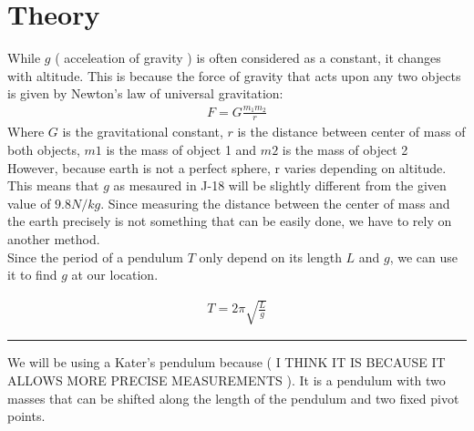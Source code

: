 \documentclass{report}
\begin{document}
\section*{Theory}

While $g$ ( acceleation of gravity ) is often considered as a constant, it changes with altitude. This is because the force of gravity that acts upon any two objects is given by Newton’s law of universal gravitation:
\begin{gather}
    F=G\frac{m_1m_2}{r}
\end{gather}
Where $G$ is the gravitational constant, $r$ is the distance between center of mass of both objects, $m1$ is the mass of object 1 and $m2$ is the mass of object 2\\

However, because earth is not a perfect sphere, r varies depending on altitude. This means that $g$ as mesaured in J-18 will be slightly different from the given value of $9.8 N/kg$. Since measuring the distance between the center of mass and the earth precisely is not something that can be easily done, we have to rely on another method.\\ 

Since the period of a pendulum $T$ only depend on its length $L$  and $g$, we can use it to find $g$ at our location.

\begin{gather}
    T=2\pi\sqrt{\frac{L}{g}}
\end{gather}

\noindent\textcolor{red}{\rule{10cm}{1mm}}

We will be using a Kater’s pendulum because ( I THINK IT IS BECAUSE IT ALLOWS MORE PRECISE MEASUREMENTS ). It is a pendulum with two masses that can be shifted along the length of the pendulum and two fixed pivot points.
\end{document}
